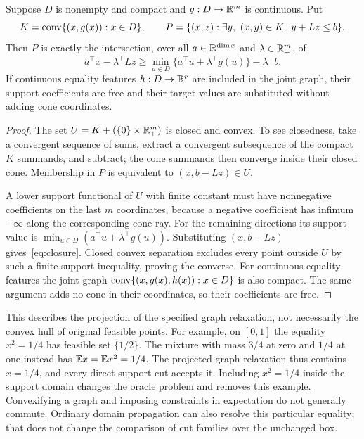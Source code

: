 \begin{theorem}\label{thm:closure}
Suppose $D$ is nonempty and compact and $g:D\to\mathbb R^m$ is continuous. Put
\[
K=\operatorname{conv}\{(x,g(x)):x\in D\},\qquad
P=\{(x,z):\exists y,\ (x,y)\in K,\ y+Lz\le b\}.
\]
Then $P$ is exactly the intersection, over all $a\in\mathbb R^{\dim x}$ and
$\lambda\in\mathbb R^m_+$, of
\begin{equation}\label{eq:closure}
a^\top x-\lambda^\top Lz\ge
\min_{u\in D}\{a^\top u+\lambda^\top g(u)\}-\lambda^\top b.
\end{equation}
If continuous equality features $h:D\to\mathbb R^r$ are included in the
joint graph, their support coefficients are free and their target values
are substituted without adding cone coordinates.
\end{theorem}
\begin{proof}
The set $U=K+(\{0\}\times\mathbb R^m_+)$ is closed and convex. To see
closedness, take a convergent sequence of sums, extract a convergent
subsequence of the compact $K$ summands, and subtract; the cone summands
then converge inside their closed cone. Membership in $P$ is equivalent
to $(x,b-Lz)\in U$.

A lower support functional of $U$ with finite constant must have
nonnegative coefficients on the last $m$ coordinates, because a negative
coefficient has infimum $-\infty$ along the corresponding cone ray.
For the remaining directions its support value is
$\min_{u\in D}(a^\top u+\lambda^\top g(u))$. Substituting
$(x,b-Lz)$ gives~\eqref{eq:closure}. Closed convex separation excludes
every point outside $U$ by such a finite support inequality, proving the
converse. For continuous equality features the joint graph
$\operatorname{conv}\{(x,g(x),h(x)):x\in D\}$ is also compact. The same argument
adds no cone in their coordinates, so their coefficients are free.
\end{proof}

This describes the projection of the specified graph relaxation, not
necessarily the convex hull of original feasible points. For example,
on $[0,1]$ the equality $x^2=1/4$ has feasible set $\{1/2\}$.
The mixture with mass $3/4$ at zero and $1/4$ at one instead has
$\mathbb E x=\mathbb E x^2=1/4$. The projected graph relaxation thus contains
$x=1/4$, and every direct support cut accepts it. Including $x^2=1/4$
inside the support domain changes the oracle problem and removes this
example. Convexifying a graph and imposing constraints in expectation do
not generally commute. Ordinary domain propagation can also resolve this
particular equality; that does not change the comparison of cut families
over the unchanged box.

